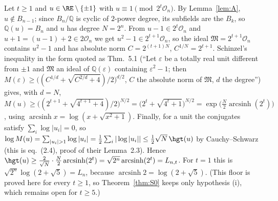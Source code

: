 Let $t\ge1$ and $u\in\RE\setminus\{\pm1\}$ with $u\equiv1\pmod{2^t\mathcal O_n}$. By Lemma~\ref{lem:A}, $u\notin B_{n-1}$; since $B_n/\mathbb Q$ is cyclic of $2$-power degree, its subfields are the $B_k$, so $\mathbb Q(u)=B_n$ and $u$ has degree $N=2^n$. From $u-1\in2^t\mathcal O_n$ and $u+1=(u-1)+2\in2\mathcal O_n$ we get $u^2-1\in2^{t+1}\mathcal O_n$, so the ideal $\mathfrak M=2^{t+1}\mathcal O_n$ contains $u^2-1$ and has absolute norm $C=2^{(t+1)N}$, $C^{1/N}=2^{t+1}$. Schinzel's inequality in the form quoted as \cite{MO3} Thm.~5.1 (``Let $\varepsilon$ be a totally real unit different from $\pm1$ and $\mathfrak M$ an ideal of $\mathbb Q(\varepsilon)$ containing $\varepsilon^2-1$; then $M(\varepsilon)\ge\big((C^{1/d}+\sqrt{C^{2/d}+4})/2\big)^{d/2}$, $C$ the absolute norm of $\mathfrak M$, $d$ the degree'') gives, with $d=N$, $M(u)\ge\big((2^{t+1}+\sqrt{4^{t+1}+4})/2\big)^{N/2}=\big(2^t+\sqrt{4^t+1}\big)^{N/2}=\exp\big(\tfrac N2\operatorname{arcsinh}(2^t)\big)$, using $\operatorname{arcsinh}x=\log(x+\sqrt{x^2+1})$. Finally, for a unit the conjugates satisfy $\sum_i\log|u_i|=0$, so $\log M(u)=\sum_{|u_i|>1}\log|u_i|=\tfrac12\sum_i|\log|u_i||\le\tfrac12\sqrt N\,\hgt(u)$ by Cauchy--Schwarz (this is \cite{MO16} eq.~(2.4), proof of their Lemma~2.3). Hence $\hgt(u)\ge\frac{2}{\sqrt N}\cdot\frac N2\operatorname{arcsinh}(2^t)=\sqrt{2^n}\operatorname{arcsinh}(2^t)=L_{n,t}$. For $t=1$ this is $\sqrt{2^n}\log(2+\sqrt5)=L_n$, because $\operatorname{arcsinh}2=\log(2+\sqrt5)$. (This floor is proved here for every $t\ge1$, so Theorem~\ref{thm:S0} keeps only hypothesis (i), which remains open for $t\ge5$.)
